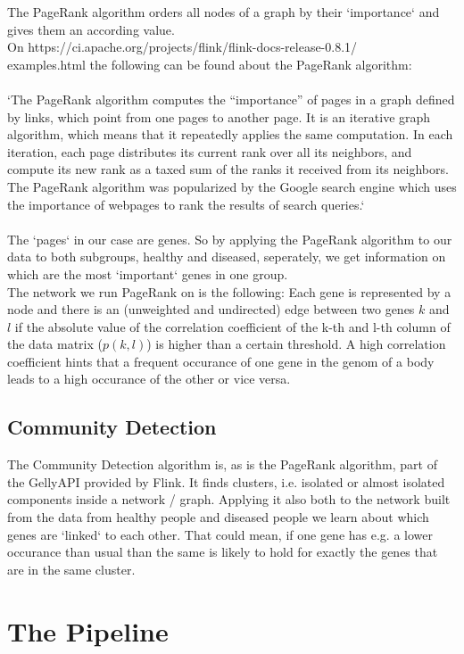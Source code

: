 \documentclass{bioinfo}
\begin{document}
The PageRank algorithm orders all nodes of a graph by their `importance` and gives them an according value.\\
On https://ci.apache.org/projects/flink/flink-docs-release-0.8.1/\\
examples.html the following can be found about the PageRank algorithm:\\\\
`The PageRank algorithm computes the “importance” of pages in a graph defined by links, which point from one pages to another page. It is an iterative graph algorithm, which means that it repeatedly applies the same computation. In each iteration, each page distributes its current rank over all its neighbors, and compute its new rank as a taxed sum of the ranks it received from its neighbors. The PageRank algorithm was popularized by the Google search engine which uses the importance of webpages to rank the results of search queries.`\\\\
The `pages` in our case are genes. So by applying the PageRank algorithm to our data to both subgroups, healthy and diseased, seperately, we get information on which are the most `important` genes in one group.\\
The network we run PageRank on is the following: Each gene is represented by a node and there is an (unweighted and undirected) edge between two genes $k$ and $l$ if the absolute value of the correlation coefficient of the k-th and l-th column of the data matrix ($p(k,l)$) is higher than a certain threshold. A high correlation coefficient hints that a frequent occurance of one gene in the genom of a body leads to a high occurance of the other or vice versa.


\subsection{Community Detection}
The Community Detection algorithm is, as is the PageRank algorithm, part of the GellyAPI provided by Flink. It finds clusters, i.e. isolated or almost isolated components inside a network / graph. Applying it also both to the network built from the data from healthy people and diseased people we learn about which genes are `linked` to each other. That could mean, if one gene has e.g. a lower occurance than usual than the same is likely to hold for exactly the genes that are in the same cluster.
 


\section{The Pipeline}
\end{document}
